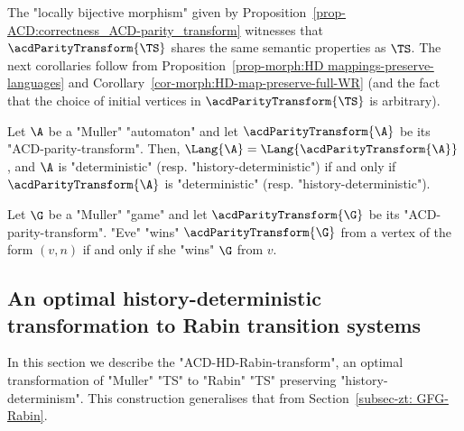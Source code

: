 \documentclass[10pt,a4paper]{amsart}
\begin{document}
The "locally bijective morphism" given by Proposition~\ref{prop-ACD:correctness_ACD-parity_transform} witnesses that $\acdParityTransform{\TS}$ shares the same semantic properties as $\TS$. The next corollaries follow from Proposition~\ref{prop-morph:HD mappings-preserve-languages} and Corollary~\ref{cor-morph:HD-map-preserve-full-WR} (and the fact that the choice of initial vertices in $\acdParityTransform{\TS}$ is arbitrary).

\begin{corollary}
	Let $\A$ be a "Muller" "automaton" and let $\acdParityTransform{\A}$ be its "ACD-parity-transform". Then, $\Lang{\A} = \Lang{\acdParityTransform{\A}}$, and $\A$ is "deterministic" (resp. "history-deterministic") if and only if $\acdParityTransform{\A}$ is "deterministic" (resp. "history-deterministic").
\end{corollary}


\begin{corollary}
	Let $\G$ be a "Muller" "game" and let $\acdParityTransform{\G}$ be its "ACD-parity-transform". "Eve" "wins" $\acdParityTransform{\G}$ from a vertex	of the form $(v,n)$ if and only if she "wins" $\G$ from $v$.
\end{corollary}



\subsection{An optimal history-deterministic transformation to Rabin transition systems}\label{subsec-acd: HD-Rabin-transformation}

In this section we describe the "ACD-HD-Rabin-transform", an optimal transformation of "Muller" "TS" to "Rabin" "TS" preserving "history-determinism". This construction generalises that from Section~\ref{subsec-zt: GFG-Rabin}.
\end{document}
